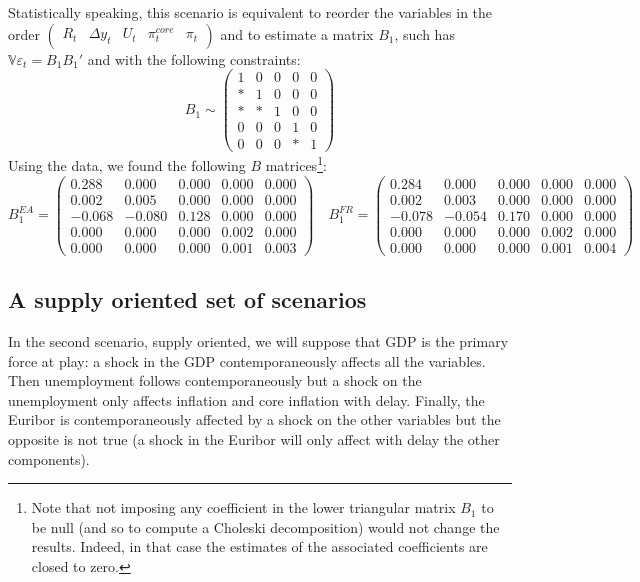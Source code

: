 \documentclass[
  10pt,
]{article}
\begin{document}
Statistically speaking, this scenario is equivalent to reorder the variables in the order
\(\begin{pmatrix} R_{t} &\Delta y_{t} & U_{t} &\pi^{core}_{t} &\pi_{t} \end{pmatrix}\) and to estimate a matrix \(B_1\), such has \(\mathbb V\varepsilon_t=B_1B_1'\) and with the following constraints:
\[ B_1\sim\begin{pmatrix}1 & 0 & 0 & 0 & 0\\
* & 1 & 0 & 0 & 0\\
* & * & 1 & 0 & 0\\
0 & 0 & 0 & 1 & 0\\
0 & 0 & 0 & * & 1
\end{pmatrix}\]
Using the data, we found the following \(B\) matrices\footnote{
  Note that not imposing any coefficient in the lower triangular matrix \(B_1\) to be null (and so to compute a Choleski decomposition) would not change the results. Indeed, in that case the estimates of the associated coefficients are closed to zero.}:
\[B_1^{EA} =\begin{pmatrix}
 0.288 & 0.000 & 0.000 & 0.000 & 0.000 \\
0.002 & 0.005 & 0.000 & 0.000 & 0.000 \\
-0.068 & -0.080 & 0.128 & 0.000 & 0.000 \\
0.000 & 0.000 & 0.000 & 0.002 & 0.000 \\
0.000 & 0.000 & 0.000 & 0.001 & 0.003 
\end{pmatrix}
\quad
B_1^{FR}=\begin{pmatrix}
 0.284 & 0.000 & 0.000 & 0.000 & 0.000 \\
0.002 & 0.003 & 0.000 & 0.000 & 0.000 \\
-0.078 & -0.054 & 0.170 & 0.000 & 0.000 \\
0.000 & 0.000 & 0.000 & 0.002 & 0.000 \\
0.000 & 0.000 & 0.000 & 0.001 & 0.004 
\end{pmatrix}\]

\hypertarget{a-supply-oriented-set-of-scenarios}{%
\subsection{A supply oriented set of scenarios}\label{a-supply-oriented-set-of-scenarios}}

In the second scenario, supply oriented, we will suppose that GDP is the primary force at play: a shock in the GDP contemporaneously affects all the variables. Then unemployment follows contemporaneously but a shock on the unemployment only affects inflation and core inflation with delay. Finally, the Euribor is contemporaneously affected by a shock on the other variables but the opposite is not true (a shock in the Euribor will only affect with delay the other components).
\end{document}
